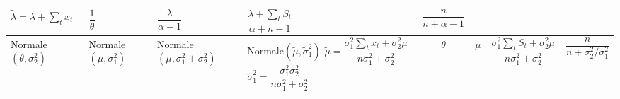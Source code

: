 \begin{center}
\begin{sideways}
\begin{tabular}{lllp{30mm}cccc}
      $\tilde{\lambda} = \lambda + \sum_t x_t$ &
      $\dfrac{1}{\theta}$ &
      $\dfrac{\lambda}{\alpha - 1}$ &
      $\dfrac{\lambda + \sum_t S_t}{\alpha + n - 1}$ &
      $\dfrac{n}{n + \alpha - 1}$ \\
      \midrule
      Normale$(\theta, \sigma_2^2)$ &
      Normale$(\mu, \sigma_1^2)$ &
      Normale$(\mu, \sigma_1^2 + \sigma_2^2)$ &
      Normale$(\tilde{\mu}, \tilde{\sigma}_1^2)$ \newline
      $\tilde{\mu} =
      \dfrac{\sigma_1^2 \sum_t x_t + \sigma_2^2 \mu}{n \sigma_1^2 +
        \sigma_2^2}$ \newline
      $\tilde{\sigma}_1^2 = \dfrac{\sigma_1^2 \sigma_2^2}{n
        \sigma_1^2 + \sigma_2^2}$ &
      $\theta$ &
      $\mu$ &
      $\dfrac{\sigma_1^2 \sum_t S_t + \sigma_2^2 \mu}{n \sigma_1^2 +
        \sigma_2^2}$ &
      $\dfrac{n}{n + \sigma_2^2/\sigma_1^2}$ \\
      \bottomrule
    \end{tabular}
  \end{sideways}
\end{center}

